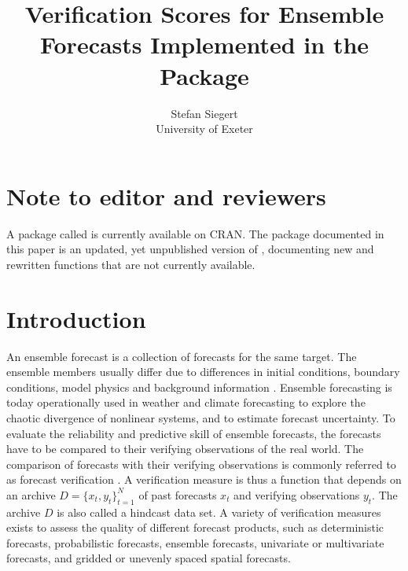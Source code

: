 \documentclass[article]{jss}\usepackage[]{graphicx}\usepackage[]{color}
\author{Stefan Siegert\\University of Exeter}
\title{Verification Scores for Ensemble Forecasts Implemented in the \proglang{R} Package \pkg{SpecsVerification}}
\begin{document}

\section*{Note to editor and reviewers}

A package called  is currently available on CRAN.
The package documented in this paper is an updated, yet unpublished version of , documenting new and rewritten functions that are not currently available.



\section{Introduction}

An ensemble forecast is a collection of forecasts for the same target.
The ensemble members usually differ due to differences in initial conditions, boundary conditions, model physics and background information \citep{gneiting2005atmospheric, leutbecher2008ensemble}.
Ensemble forecasting is today operationally used in weather and climate forecasting to explore the chaotic divergence of nonlinear systems, and to estimate forecast uncertainty.
To evaluate the reliability and predictive skill of ensemble forecasts, the forecasts have to be compared to their verifying observations of the real world.
%
The comparison of forecasts with their verifying observations is commonly referred to as forecast verification \citep{jolliffe2012forecast}.
A verification measure is thus a function that depends on an archive $D=\{x_t, y_t\}_{t=1}^N$ of past forecasts $x_t$ and verifying observations $y_t$.
The archive $D$ is also called a hindcast data set.
A variety of verification measures exists to assess the quality of different forecast products, such as deterministic forecasts, probabilistic forecasts, ensemble forecasts, univariate or multivariate forecasts, and gridded or unevenly spaced spatial forecasts.
\end{document}
